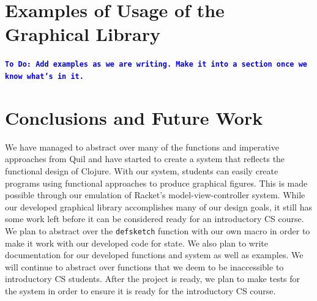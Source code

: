 \documentclass[12pt]{article}
\newcommand{\comment}[1]{{\bf \tt  {#1}}}
\newcommand{\todo}[1]{\textcolor{blue}{\comment{To Do: {#1}}}}
\begin{document}
\section{Examples of Usage of the Graphical Library}\label{sec:usage}
\todo{Add examples as we are writing.  Make it into a section once we know what's in it.}

\section{Conclusions and Future Work}\label{sec:future-work}
We have managed to abstract over many of the functions and imperative approaches from Quil and have started to create a system that reflects the functional design of Clojure. With our system, students can easily create programs using functional approaches to produce graphical figures. This is made possible through our emulation of Racket’s model-view-controller system.  
While our developed graphical library accomplishes many of our design goals, it still has some work left before it can be considered ready for an introductory CS course. We plan to abstract over the \texttt{defsketch} function with our own macro in order to make it work with our developed code for state. We also plan to write documentation for our developed functions and system as well as examples. We will continue to abstract over functions that we deem to be inaccessible to introductory CS students. After the project is ready, we plan to make tests for the system in order to ensure it is ready for the introductory CS course.  


%
%

%  
%
%




\end{document}
